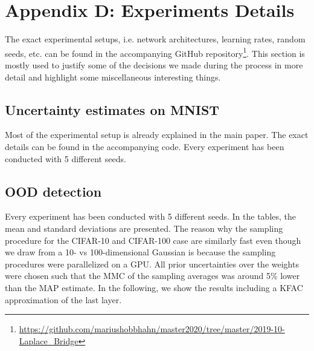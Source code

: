 \section*{Appendix D: Experiments Details}
\label{sec:expDetails}

The exact experimental setups, i.e. network architectures, learning rates, random seeds, etc. can be found in the accompanying GitHub repository\footnote{\url{https://github.com/mariushobbhahn/master2020/tree/master/2019-10-Laplace_Bridge}}.
This section is mostly used to justify some of the decisions we made during the process in more detail and highlight some miscellaneous interesting things. 

\subsection*{Uncertainty estimates on MNIST}

Most of the experimental setup is already explained in the main paper. The exact details can be found in the accompanying code. Every experiment has been conducted with 5 different seeds.

\subsection*{OOD detection}

Every experiment has been conducted with 5 different seeds. In the tables, the mean and standard deviations are presented. 
The reason why the sampling procedure for the CIFAR-10 and CIFAR-100 case are similarly fast even though we draw from a 10- vs 100-dimensional Gaussian is because the sampling procedures were parallelized on a GPU. All prior uncertainties over the weights were chosen such that the MMC of the sampling averages was around 5\% lower than the MAP estimate. 
In the following, we show the results including a KFAC approximation of the last layer. 

